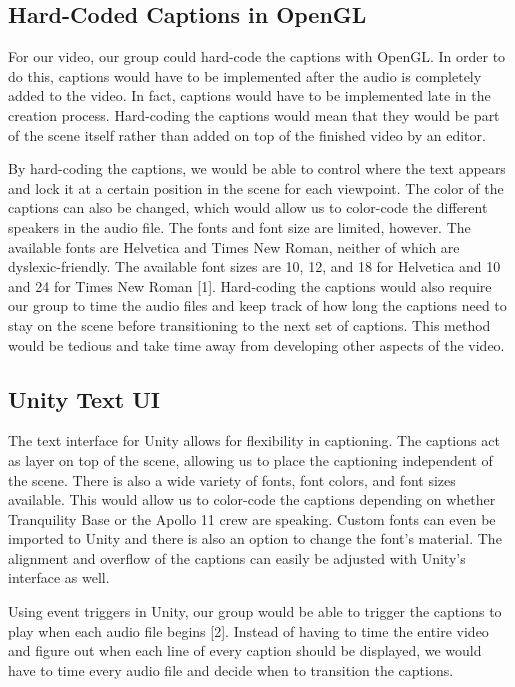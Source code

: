 \documentclass[onecolumn, draftclsnofoot,10pt, compsoc]{IEEEtran}
\begin{document}
\subsection{Hard-Coded Captions in OpenGL}
For our video,  our group could hard-code the captions with OpenGL. In order to do this, captions would have to be implemented after the audio is completely added to the video. In fact, captions would have to be implemented late in the creation process. Hard-coding the captions would mean that they would be part of the scene itself rather than added on top of the finished video by an editor.

By hard-coding the captions, we would be able to control where the text appears and lock it at a certain position in the scene for each viewpoint. The color of the captions can also be changed, which would allow us to color-code the different speakers in the audio file. The fonts and font size are limited, however. The available fonts are Helvetica and Times New Roman, neither of which are dyslexic-friendly. The available font sizes are 10, 12, and 18 for Helvetica and 10 and 24 for Times New Roman [1]. Hard-coding the captions would also require our group to time the audio files and keep track of how long the captions need to stay on the scene before transitioning to the next set of captions. This method would be tedious and take time away from developing other aspects of the video.

\subsection{Unity Text UI}
The text interface for Unity allows for flexibility in captioning. The captions act as layer on top of the scene, allowing us to place the captioning independent of the scene. There is also a wide variety of fonts, font colors, and font sizes available. This would allow us to color-code the captions depending on whether Tranquility Base or the Apollo 11 crew are speaking. Custom fonts can even be imported to Unity and there is also an option to change the font's material. The alignment and overflow of the captions can easily be adjusted with Unity's interface as well. 

Using event triggers in Unity, our group would be able to trigger the captions to play when each audio file begins [2]. Instead of having to time the entire video and figure out when each line of every caption should be displayed, we would have to time every audio file and decide when to transition the captions.
\end{document}
